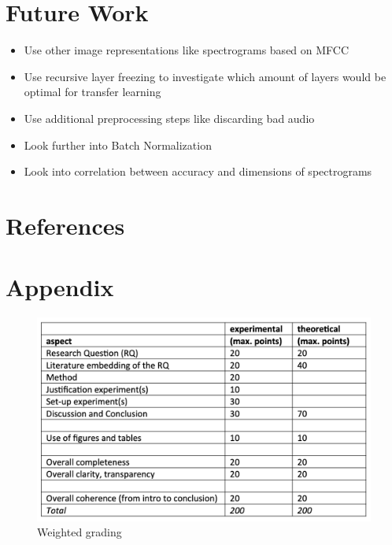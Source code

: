 \documentclass{article}
\theoremstyle{definition}
\theoremstyle{remark}
\begin{document}
\section{Future Work} \label{future_work}


\begin{itemize}
	\item Use other image representations like spectrograms based on MFCC
	\item Use recursive layer freezing to investigate which amount of layers would be optimal for transfer learning
	\item Use additional preprocessing steps like discarding bad audio
	\item Look further into Batch Normalization
	\item Look into correlation between accuracy and dimensions of spectrograms
\end{itemize}



\section{References}




\section{Appendix}

\begin{figure}[h]
    \centering
    \includegraphics[width=1\textwidth]{img/grading.png}
    \caption{Weighted grading}
    \label{fig:my_label}
\end{figure}
\end{document}
